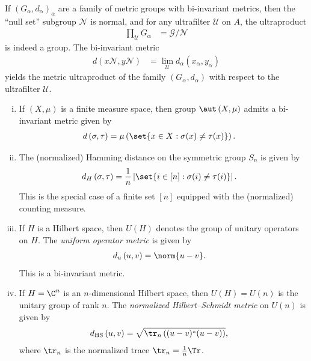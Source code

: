 \documentclass[10pt]{mypackage}
\begin{document}
If $\left( G_{\alpha},d_{\alpha} \right)_{\alpha}$ are a family of metric groups with bi-invariant metrics, then the ``null set'' subgroup $\mathcal{N}$ is normal, and for any ultrafilter $ \mathcal{U} $ on $A$, the ultraproduct
\begin{align*}
  \prod_{\mathcal{U}} G_{\alpha} &= \mathcal{G}/\mathcal{N}
\end{align*}
is indeed a group. The bi-invariant metric
\begin{align*}
  d\left( x\mathcal{N},y\mathcal{N} \right) &= \lim_{\mathcal{U}} d_{\alpha}\left( x_{\alpha},y_{\alpha} \right)
\end{align*}
yields the metric ultraproduct of the family $\left( G_{\alpha},d_{\alpha} \right)$ with respect to the ultrafilter $ \mathcal{U} $.
\begin{example}\hfill
  \begin{enumerate}[(i)]
    \item If $\left( X,\mu \right)$ is a finite measure space, then group $\aut\left( X,\mu \right)$ admits a bi-invariant metric given by
      \begin{align*}
        d\left( \sigma,\tau \right) &= \mu\left( \set{x\in X : \sigma(x)\neq \tau(x)} \right).
      \end{align*}
    \item The (normalized) Hamming distance on the symmetric group $S_n$ is given by
      \begin{align*}
        d_{H}\left( \sigma,\tau \right) &= \frac{1}{n}\left\vert \set{i\in [n] : \sigma(i)\neq \tau(i)} \right\vert.
      \end{align*}
      This is the special case of a finite set $[n]$ equipped with the (normalized) counting measure.
    \item If $H$ is a Hilbert space, then $U\left( H \right)$ denotes the group of unitary operators on $H$. The \textit{uniform operator metric} is given by
      \begin{align*}
        d_{u}\left( u,v \right) &= \norm{u-v}.
      \end{align*}
      This is a bi-invariant metric.
    \item If $H = \C^n$ is an $n$-dimensional Hilbert space, then $U(H) = U(n)$ is the unitary group of rank $n$. The \textit{normalized Hilbert--Schmidt metric} on $U(n)$ is given by
      \begin{align*}
        d_{\operatorname{HS}}\left( u,v \right) &= \sqrt{\tr_n\left( (u-v)^{\ast}(u-v) \right)},
      \end{align*}
      where $\tr_n$ is the normalized trace $\tr_n = \frac{1}{n}\Tr$.
  \end{enumerate}
\end{example}
\end{document}
